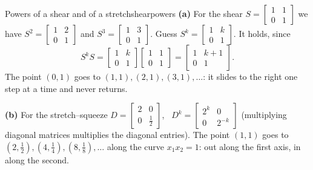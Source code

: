 \documentclass[11pt]{article}
\begin{document}
\begin{exmp}{Powers of a shear and of a stretch}{shearpowers}
\textbf{(a)} For the shear $S=\begin{bmatrix}1&1\\0&1\end{bmatrix}$ we have $S^2=\begin{bmatrix}1&2\\0&1\end{bmatrix}$ and $S^3=\begin{bmatrix}1&3\\0&1\end{bmatrix}$. Guess $S^k=\begin{bmatrix}1&k\\0&1\end{bmatrix}$. It holds, since
\[
S^kS=\begin{bmatrix}1&k\\0&1\end{bmatrix}\begin{bmatrix}1&1\\0&1\end{bmatrix}=\begin{bmatrix}1&k+1\\0&1\end{bmatrix}.
\]
The point $(0,1)$ goes to $(1,1),(2,1),(3,1),\dots$: it slides to the right one step at a time and never returns.

\textbf{(b)} For the stretch--squeeze $D=\begin{bmatrix}2&0\\0&\tfrac12\end{bmatrix}$, \ $D^k=\begin{bmatrix}2^k&0\\0&2^{-k}\end{bmatrix}$ (multiplying diagonal matrices multiplies the diagonal entries). The point $(1,1)$ goes to $(2,\tfrac12),(4,\tfrac14),(8,\tfrac18),\dots$ along the curve $x_1x_2=1$: out along the first axis, in along the second.
\end{exmp}
\end{document}
